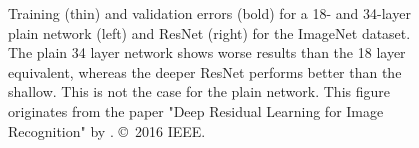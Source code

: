 \begin{figure}
	\caption{
		Training (thin) and validation errors (bold) for a 18- and 34-layer plain network (left) and ResNet (right) for the ImageNet dataset.
		The plain 34 layer network shows worse results than the 18 layer equivalent, whereas the deeper ResNet performs better than the shallow.
		This is not the case for the plain network.
		This figure originates from the paper "Deep Residual Learning for Image Recognition" by \citet{he16}. \copyright~2016 IEEE.}
	\label{fig:depth-performance-decline}
\end{figure}